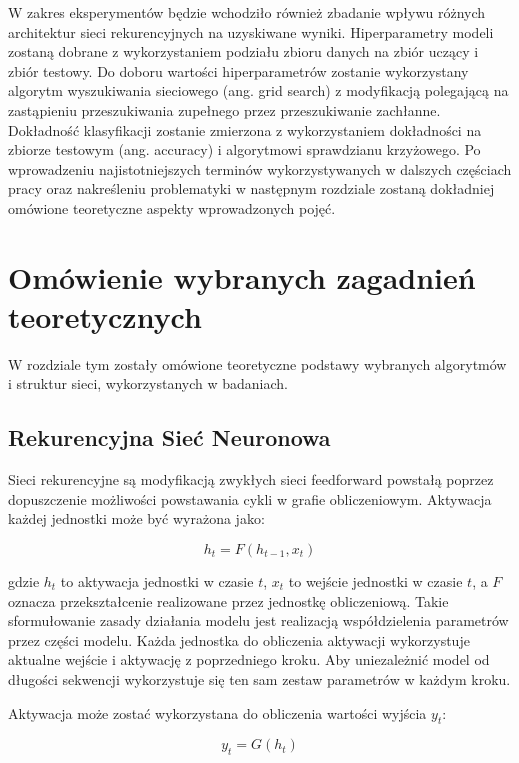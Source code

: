 \documentclass[oneside, mag]{mgr}
\begin{document}
W zakres eksperymentów będzie wchodziło również zbadanie wpływu różnych architektur sieci rekurencyjnych na uzyskiwane wyniki. Hiperparametry modeli zostaną dobrane z wykorzystaniem podziału zbioru danych na zbiór uczący i zbiór testowy. Do doboru wartości hiperparametrów zostanie wykorzystany algorytm wyszukiwania sieciowego (ang. grid search) z modyfikacją polegającą na zastąpieniu przeszukiwania zupełnego przez przeszukiwanie zachłanne. Dokładność klasyfikacji zostanie zmierzona z wykorzystaniem dokładności na zbiorze testowym (ang. accuracy) i algorytmowi sprawdzianu krzyżowego. Po wprowadzeniu najistotniejszych terminów wykorzystywanych w dalszych częściach pracy oraz nakreśleniu problematyki w następnym rozdziale zostaną dokładniej omówione teoretyczne aspekty wprowadzonych pojęć.


\chapter{Omówienie wybranych zagadnień teoretycznych}

W rozdziale tym zostały omówione teoretyczne podstawy wybranych algorytmów i struktur sieci, wykorzystanych w badaniach.

\section{Rekurencyjna Sieć Neuronowa}

Sieci rekurencyjne są modyfikacją zwykłych sieci feedforward powstałą poprzez dopuszczenie możliwości powstawania cykli w grafie obliczeniowym. Aktywacja każdej jednostki może być wyrażona jako:


\begin{equation}
	h_t = F(h_{t-1}, x_t)
	\label{eq:basic-rnn}
\end{equation}

gdzie $h_t$ to aktywacja jednostki w czasie $t$, $x_t$ to wejście jednostki w czasie $t$, a $F$ oznacza przekształcenie realizowane przez jednostkę obliczeniową. Takie sformułowanie zasady działania modelu jest realizacją współdzielenia parametrów przez części modelu. Każda jednostka do obliczenia aktywacji wykorzystuje aktualne wejście i aktywację z poprzedniego kroku. Aby uniezależnić model od długości sekwencji wykorzystuje się ten sam zestaw parametrów w każdym kroku.

Aktywacja może zostać wykorzystana do obliczenia wartości wyjścia $y_t$:

\begin{equation}
	y_t = G(h_t)
\end{equation}
\end{document}
